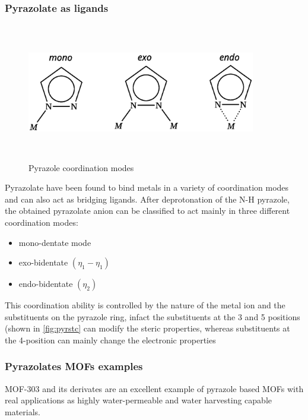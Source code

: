 \documentclass[../Master.tex]{subfiles}
\begin{document}
\subsubsection{Pyrazolate as ligands}
\begin{figure}[h]
	\centering
	\includegraphics[width=10cm,height=6cm,keepaspectratio]{Structures/pyrazolecordmode.eps}
	\caption{Pyrazole coordination modes}\label{fig:pyrazole-cord-mode}
\end{figure}
Pyrazolate have been found to bind metals in a variety of coordination modes and can also act as bridging ligands.
After deprotonation of the N-H pyrazole, the obtained pyrazolate anion can be classified to act mainly in three different coordination modes:
\begin{itemize}
	\item  mono-dentate mode
	\item exo-bidentate \((\eta_{1}-\eta_{1})\)
	\item endo-bidentate \((\eta_{2})\)
\end{itemize}
This coordination ability is controlled by the nature of the metal ion and the substituents on the pyrazole ring, infact the substituents at the 3 and 5 positions (shown in \ref{fig:pyrstc} can modify the steric properties, whereas substituents at the 4-position can mainly change the electronic properties

\subsubsection{Pyrazolates MOFs examples}
MOF-303 and its derivates are an excellent example of pyrazole based MOFs with real applications as highly water-permeable\cite{cong_highly_2021} and water harvesting\cite{zheng_broadly_2022} capable materials.

\end{document}
